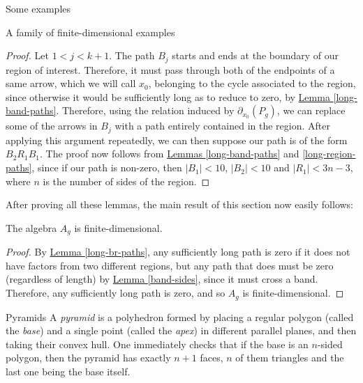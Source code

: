\begin{chapter}{Some examples}
\begin{section}{A family of finite-dimensional examples}
\begin{proof}
Let $1<j<k+1$. The path $B_j$ starts and ends at the boundary of our region of interest. Therefore, it must pass through both of the endpoints of a same arrow, which we will call $x_0$, belonging to the cycle associated to the region, since otherwise it would be sufficiently long as to reduce to zero, by \hyperref[long-band-paths]{Lemma \ref*{long-band-paths}}. Therefore, using the relation induced by $\partial_{x_0}(P_g)$, we can replace some of the arrows in $B_j$ with a path entirely contained in the region.
After applying this argument repeatedly, we can then suppose our path is of the form $B_2 R_1 B_1$. The proof now follows from \hyperref[long-band-paths]{Lemmas \ref*{long-band-paths}} and \ref{long-region-paths}, since if our path is non-zero, then $|B_1|<10$, $|B_2|<10$ and $|R_1|<3n-3$, where $n$ is the number of sides of the region.
\end{proof}

After proving all these lemmas, the main result of this section now easily follows:

\begin{thm} The algebra $A_g$ is finite-dimensional.
\end{thm}
\begin{proof} By \hyperref[long-br-paths]{Lemma \ref*{long-br-paths}}, any sufficiently long path is zero if it does not have factors from two different regions, but any path that does must be zero (regardless of length) by \hyperref[band-sides]{Lemma \ref*{band-sides}}, since it must cross a band. Therefore, any sufficiently long path is zero, and so $A_g$ is finite-dimensional.
\end{proof}
\end{section}

\begin{section}{Pyramids}
\label{pyramids}
A \emph{pyramid} is a polyhedron formed by placing a regular polygon (called the \emph{base}) and a single point (called the \emph{apex}) in different parallel planes, and then taking their convex hull. One immediately checks that if the base is an $n$-sided polygon, then the pyramid has exactly $n+1$ faces, $n$ of them triangles and the last one being the base itself.


\end{section}
\end{chapter}
